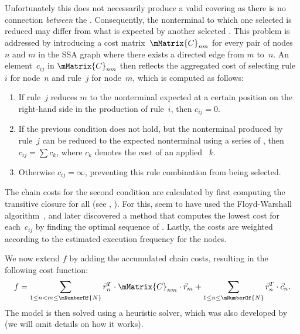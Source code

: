 Unfortunately this does not necessarily produce a valid covering as there is no
connection \emph{between} the \tbaseRules.
%
Consequently, the
\gls{nonterminal} to which one selected \tbaseRule is reduced may differ
from what is expected by another selected \tbaseRule.
%
This problem is
addressed by introducing a cost matrix~$\mMatrix{C}_{nm}$ for every pair of
\glspl{node}~$n$ and $m$ in the \gls{SSA graph} where there exists a directed
\gls{edge} from $m$ to~$n$.
%
An element~$c_{ij}$ in $\mMatrix{C}_{nm}$ then
reflects the aggregated cost of selecting rule~$i$ for \gls{node}~$n$ and
rule~$j$ for \gls{node}~$m$, which is computed as follows:
\begin{enumerate}
  \item If rule~$j$ reduces $m$ to the \gls{nonterminal} expected at a certain
    position on the right-hand side in the \gls{production} of rule~$i$, then
    \mbox{$c_{ij} = 0$}.
  \item If the previous condition does not hold, but the \gls{nonterminal}
    produced by rule~$j$ can be reduced to the expected \gls{nonterminal} using
    a series of \tchainRules, then \mbox{$c_{ij} = \sum c_k$}, where $c_k$
    denotes the cost of an applied \tchainRule~$k$.
  \item Otherwise \mbox{$c_{ij} = \infty$}, preventing this rule combination
    from being selected.
\end{enumerate}
The chain costs for the second condition are calculated by first computing the
\gls{transitive closure} for all \tchainRules (see
, ).
%
For this,
\citeauthor{Eckstein2003} seem to have used the Floyd-Warshall
algorithm~\cite{Floyd1962}, and \textcite{Schaefer2007} later discovered a
method that computes the lowest cost for each~$c_{ij}$ by finding the optimal
sequence of \tchainRules.
%
Lastly, the costs are weighted according to the
estimated execution frequency for the \glspl{node}.

We now extend $f$ by adding the accumulated chain costs, resulting in the
following cost function:
\begin{displaymath}
  f =
  \sum_{1 \leq n < m \leq \mNumberOf{N}}
    \mVector{r}_n^T \cdot \mMatrix{C}_{nm} \cdot \mVector{r}_m
  +
  \sum_{1 \leq n \leq \mNumberOf{N}} \mVector{r}_n^T \cdot \mVector{c}_n.
\end{displaymath}
The model is then solved using a heuristic  solver, which
was also developed by \citeauthor{Eckstein2003} (we will omit details on how it
works).

